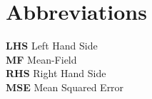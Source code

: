 \documentclass[openany]{article}
\begin{document}
%

\clearpage\thispagestyle{empty}\null\newpage %

\newpage
\thispagestyle{plain}

\section*{Abbreviations}

\textbf{LHS} Left Hand Side \\

\textbf{MF} Mean-Field \\

\textbf{RHS} Right Hand Side \\

\textbf{MSE} Mean Squared Error

\clearpage\thispagestyle{empty}\null\newpage %

\newpage
\thispagestyle{plain}
{
    \tableofcontents
}


\thispagestyle{empty}

\clearpage\thispagestyle{empty}\null\newpage %


\newpage


\newpage


\newpage


\newpage


\newpage


\newpage


\newpage


\newpage


\newpage

\end{document}
